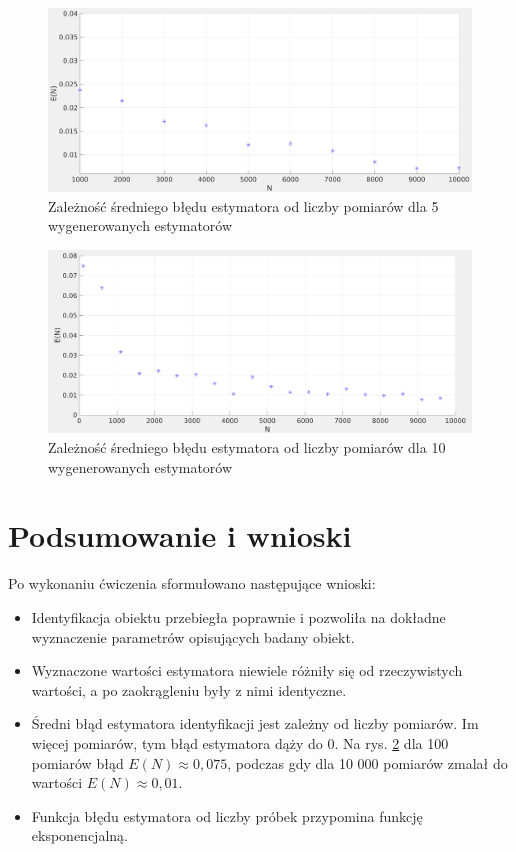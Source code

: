 \documentclass[12pt]{article}
\begin{document}
\begin{figure}[H]
    \centering
    \includegraphics[width = \textwidth]{to2.png}
    \caption{Zależność średniego błędu estymatora od liczby pomiarów dla 5 wygenerowanych estymatorów}
    \label{blad_pomiaru1}
\end{figure}

\begin{figure}[H]
    \centering
    \includegraphics[width = \textwidth]{to3.png}
    \caption{Zależność średniego błędu estymatora od liczby pomiarów dla 10 wygenerowanych estymatorów}
    \label{blad_pomiaru2}
\end{figure}

\section{Podsumowanie i wnioski}
Po wykonaniu ćwiczenia sformułowano następujące wnioski:
\begin{itemize}
    \item Identyfikacja obiektu przebiegła poprawnie i pozwoliła na dokładne wyznaczenie parametrów opisujących badany obiekt.
    \item Wyznaczone wartości estymatora niewiele różniły się od rzeczywistych wartości, a po zaokrągleniu były z nimi identyczne.
    \item Średni błąd estymatora identyfikacji jest zależny od liczby pomiarów. Im więcej pomiarów, tym błąd estymatora dąży do 0. Na rys. \ref{blad_pomiaru2} dla 100 pomiarów błąd $E(N) \approx 0,075$, podczas gdy dla 10 000 pomiarów zmalał do wartości $E(N) \approx 0,01$.
    \item Funkcja błędu estymatora od liczby próbek przypomina funkcję eksponencjalną.
\end{itemize}
\end{document}
